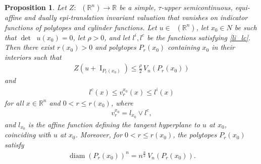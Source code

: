 \documentclass[11pt]{article}
\newtheorem{prop}[teo]{Proposition}
\theoremstyle{definition} %
\newcommand{\RR}{(\mathbb{R}^n)}
\DeclareMathOperator{\I}{I}
\DeclareMathOperator{\D}{D^2}
\DeclareMathOperator{\LP}{Conv_{lp}}
\DeclareMathOperator{\diam}{diam}
\begin{document}
\begin{prop}\label{regularr2}
Let $Z:\LP\RR\rightarrow\mathbb{R}$ be a simple, $\tau$-upper semicontinuous, equi-affine and  dually epi-translation   invariant valuation that   vanishes on  indicator functions of polytopes and cylinder functions. Let $u \in \LP(\mathbb{R}^n)$,
let $x_0\in N$ be such that $\det \D u(x_0)=0$,  let $\rho>0$, and let $l^i, l^c$  be the functions satisfying \eqref{li_lc}. Then there exist $r(x_0)>0$ and   polytopes $P_r(x_0)$ containing $x_0$ in their interiors  such that
\begin{align}\label{eq10.67m}
  Z(u+\I_{P_r(x_0)})\leq \frac{\rho}{2}\, V_n(P_r(x_0))
\end{align}
and
\begin{align}\label{eq10.66m}
 l^c(x)\leq v_r^{x_0}(x)\leq l^i(x)    
\end{align}
for all  $x\in \mathbb{R}^n$ and $0<r\leq r(x_0)$, where
\begin{align}\label{eq41112m}
  v_r^{x_0}= l_{x_0}\vee l^c,  
\end{align}
and $l_{x_0}$ is the affine function defining the tangent hyperplane to $u$ at $x_0$, coinciding with $u$ at $x_0$. Moreover, for $0<r\leq r(x_0)$, the 
polytopes $P_r(x_0)$ satisfy 
\begin{align}\label{eq10.53..m}
\diam(P_r(x_0))^n= n^{\frac{n}{2}}\, V_n(P_r(x_0)).    
\end{align}
\end{prop}
\end{document}

